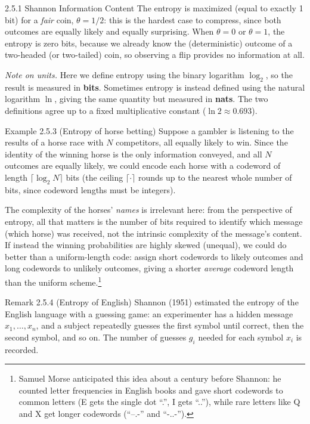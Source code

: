 \documentclass[aspectratio=169,10pt]{beamer}
\begin{document}
\begin{frame}[allowframebreaks]{2.5.1 Shannon Information Content}
The entropy is maximized (equal to exactly 1 bit) for a \emph{fair} coin,
$\theta = 1/2$: this is the hardest case to compress, since both outcomes are
equally likely and equally surprising. When $\theta = 0$ or $\theta = 1$, the
entropy is zero bits, because we already know the (deterministic) outcome of
a two-headed (or two-tailed) coin, so observing a flip provides no
information at all.

\framebreak

\textit{Note on units.} Here we define entropy using the binary logarithm
$\log_2$, so the result is measured in \textbf{bits}. Sometimes entropy is
instead defined using the natural logarithm $\ln$, giving the same
quantity but measured in \textbf{nats}. The two definitions agree up to a
fixed multiplicative constant ($\ln 2 \approx 0.693$).

\begin{exampleblock}{Example 2.5.3 (Entropy of horse betting)}
Suppose a gambler is listening to the results of a horse race with $N$
competitors, all equally likely to win. Since the identity of the winning
horse is the only information conveyed, and all $N$ outcomes are equally
likely, we could encode each horse with a codeword of length $\lceil \log_2
N \rceil$ bits (the ceiling $\lceil \cdot \rceil$ rounds up to the nearest
whole number of bits, since codeword lengths must be integers).
\end{exampleblock}

The complexity of the horses' \emph{names} is irrelevant here: from the
perspective of entropy, all that matters is the number of bits required to
identify which message (which horse) was received, not the intrinsic
complexity of the message's content. If instead the winning probabilities
are highly skewed (unequal), we could do better than a uniform-length code:
assign short codewords to likely outcomes and long codewords to unlikely
outcomes, giving a shorter \emph{average} codeword length than the uniform
scheme.\footnote{Samuel Morse anticipated this idea about a century before
Shannon: he counted letter frequencies in English books and gave short
codewords to common letters (E gets the single dot ``.'', I gets ``..''),
while rare letters like Q and X get longer codewords (``--.-'' and
``-..-'').}

\framebreak

\begin{block}{Remark 2.5.4 (Entropy of English)}
Shannon (1951) estimated the entropy of the English language with a
guessing game: an experimenter has a hidden message $x_1,\ldots,x_n$, and a
subject repeatedly guesses the first symbol until correct, then the second
symbol, and so on. The number of guesses $g_i$ needed for each symbol $x_i$
is recorded.
\end{block}


\end{frame}
\end{document}
